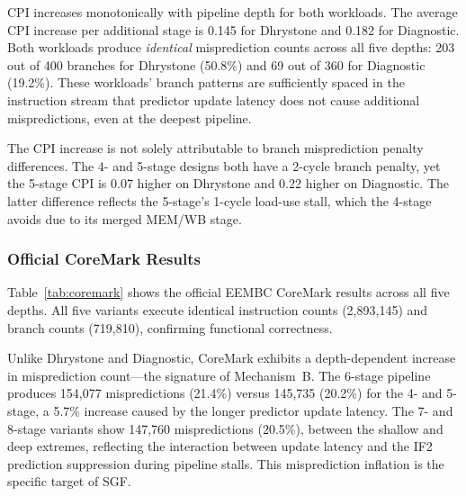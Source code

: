 \documentclass[journal]{IEEEtran}
\begin{document}
\begin{table}[t]
\begin{table}[t]
\begin{table}[t]
\begin{table}[t]
CPI increases monotonically with pipeline depth for both workloads. The average CPI increase per additional stage is 0.145 for Dhrystone and 0.182 for Diagnostic. Both workloads produce \emph{identical} misprediction counts across all five depths: 203 out of 400 branches for Dhrystone (50.8\%) and 69 out of 360 for Diagnostic (19.2\%). These workloads' branch patterns are sufficiently spaced in the instruction stream that predictor update latency does not cause additional mispredictions, even at the deepest pipeline.

The CPI increase is not solely attributable to branch misprediction penalty differences. The 4- and 5-stage designs both have a 2-cycle branch penalty, yet the 5-stage CPI is 0.07 higher on Dhrystone and 0.22 higher on Diagnostic. The latter difference reflects the 5-stage's 1-cycle load-use stall, which the 4-stage avoids due to its merged MEM/WB stage.

\subsubsection{Official CoreMark Results}

Table~\ref{tab:coremark} shows the official EEMBC CoreMark results across all five depths. All five variants execute identical instruction counts (2{,}893{,}145) and branch counts (719{,}810), confirming functional correctness.

Unlike Dhrystone and Diagnostic, CoreMark exhibits a depth-dependent increase in misprediction count---the signature of Mechanism~B. The 6-stage pipeline produces 154{,}077 mispredictions (21.4\%) versus 145{,}735 (20.2\%) for the 4- and 5-stage, a 5.7\% increase caused by the longer predictor update latency. The 7- and 8-stage variants show 147{,}760 mispredictions (20.5\%), between the shallow and deep extremes, reflecting the interaction between update latency and the IF2 prediction suppression during pipeline stalls. This misprediction inflation is the specific target of SGF.


\end{table}
\end{table}
\end{table}
\end{table}
\end{document}
